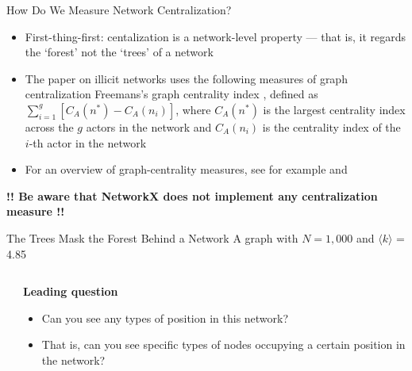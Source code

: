 \documentclass[notes, aspectratio=1610]{beamer}
\begin{document}
\begin{frame}{How Do We Measure Network Centralization?}{}
	\begin{itemize}
		\item First-thing-first: centalization is a network-level 
		property --- that is, it regards the `forest' not the `trees'
		of a network
		\item The paper on illicit networks uses the following measures 
		of graph centralization Freemans's graph centrality index \cite{freeman1979}
		, defined as $\sum_{i=1}^{g}[C_{A}(n^{*}) - C_{A}(n_{i})]$,
		where $C_{A}(n^{*})$ is the largest centrality index across 
		the $g$ actors in the network and $C_{A}(n_{i})$ is the
		centrality index of the $i$-th actor in the network
		\item For an overview of graph-centrality measures, see for 
		example \cite{borgatti_everett2006} and \cite[][pages 176-177]{wasserman_faust1994}
	\end{itemize}

	\vspace{2em}

	\textbf{\small !! Be aware that NetworkX does not implement any centralization 
	measure !!}
\end{frame}

\begin{frame}{The Trees Mask the Forest Behind a Network}
	{A graph with $N = 1,000$ and $\langle k \rangle$ = 4.85 }
	\begin{columns}
		\begin{column}{0.5\textwidth}
			\centering 
			

		\end{column}
		\begin{column}{0.3\textwidth}
			\textbf{Leading question}

			\begin{itemize}
				\item 
				Can you see any types of position in this network?
				\item That is, can you see specific types of nodes 
				occupying a certain position in the network?
			\end{itemize}
		\end{column}
	\end{columns}
\end{frame}
\end{document}
